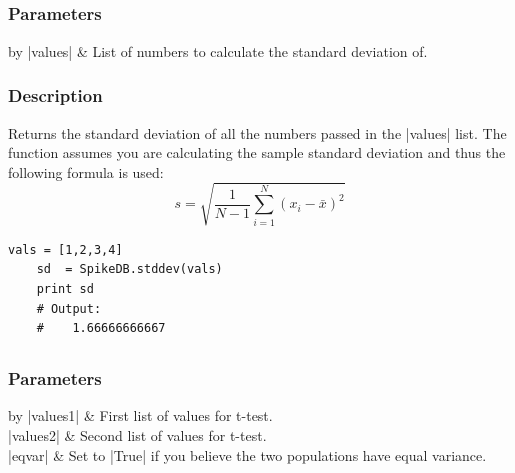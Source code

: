 \documentclass{report}
\begin{document}
\clearpage
\subsection[\method{float}{stddev}]{}
\subsubsection{Parameters}
\begin{table}[h]
\begin{center}
\begin{tabular}{by}
		|values| & List of numbers to calculate the standard deviation of.\\
	\end{tabular}
\end{center}
\end{table}
\subsubsection{Description}
Returns the standard deviation of all the numbers passed in the |values| list. The function assumes you are calculating the sample standard deviation and thus the following formula is used: 
\[
	s = \sqrt{\frac{1}{N-1}\sum_{i=1}^{N}(x_i-\bar{x})^2}
\]
\begin{lstlisting}[caption=Example]
	vals = [1,2,3,4]
	sd  = SpikeDB.stddev(vals)
	print sd
	# Output:
	#    1.66666666667
\end{lstlisting}

\clearpage
\subsection[\method{dict}{ttest}]{}
\subsubsection{Parameters}
\begin{table}[h]
\begin{center}
\begin{tabular}{by}
		|values1| & First list of values for t-test.\\
		|values2| & Second list of values for t-test.\\
		|eqvar| & Set to |True| if you believe the two populations have equal variance.\\
	\end{tabular}
\end{center}
\end{table}
\end{document}
